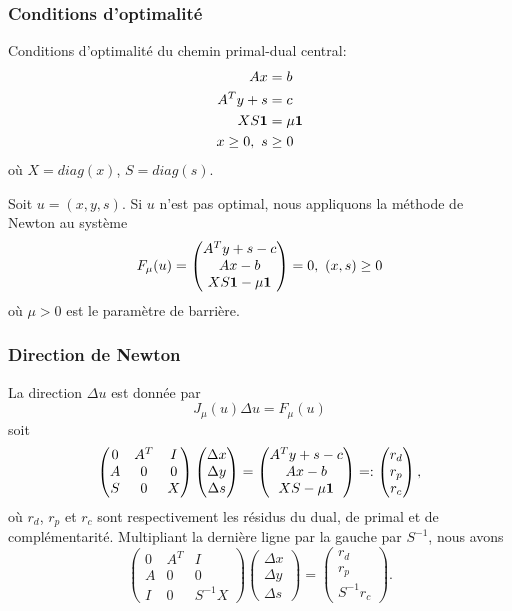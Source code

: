 \documentclass[usepdftitle=false, aspectratio=169]{beamer}
\begin{document}
\begin{frame}
\frametitle{Conditions d'optimalité}

Conditions d'optimalité du chemin primal-dual central:
\begin{align*}
Ax &= b \\
A^Ty + s &= c \\
XS{\boldsymbol{1}} &= \mu{\boldsymbol{1}} \\
x \geq 0,\ s & \geq 0
\end{align*}
où $X = diag(x)$, $S= diag(s)$.

\mbox{}

Soit $u = (x, y, s)$. Si $u$ n'est pas optimal, nous appliquons la méthode de Newton au système
$$
F_{\mu}(u) = \begin{pmatrix}
	A^Ty+s-c  \\
	Ax-b  \\
	XS{\boldsymbol{1}} - \mu{\boldsymbol{1}} 
\end{pmatrix} = 0, \ (x,s) \geq 0
$$
où $\mu > 0$ est le paramètre de barrière.

\end{frame}

\begin{frame}
\frametitle{Direction de Newton}

La direction $\Delta u$ est donnée par
$$
J_{\mu}(u)\Delta u = F_{\mu}(u)
$$
soit
$$
\begin{pmatrix}
	0 & A^T & I  \\
	A & 0 & 0\\
	S & 0 & X
\end{pmatrix}
\begin{pmatrix}
	\Delta x  \\
	\Delta y \\
	\Delta s
\end{pmatrix} = \begin{pmatrix}
	A^Ty+s-c  \\
	Ax-b  \\
	XS-\mu {\boldsymbol{1}}
\end{pmatrix}
=:
\begin{pmatrix}
	r_d  \\
	r_p \\
	r_c
\end{pmatrix},
$$
où $r_d$, $r_p$ et $r_c$ sont respectivement les résidus du dual, de primal et de complémentarité.
Multipliant la dernière ligne par la gauche par $S^{-1}$, nous avons
$$
\begin{pmatrix}
	0 & A^T & I  \\
	A & 0 & 0\\
	I & 0 & S^{-1}X
\end{pmatrix}
\begin{pmatrix}
	\Delta x  \\
	\Delta y \\
	\Delta s
\end{pmatrix} = \begin{pmatrix}
	r_d  \\
	r_p  \\
	S^{-1}r_c 
\end{pmatrix}.
$$

\end{frame}
\end{document}
